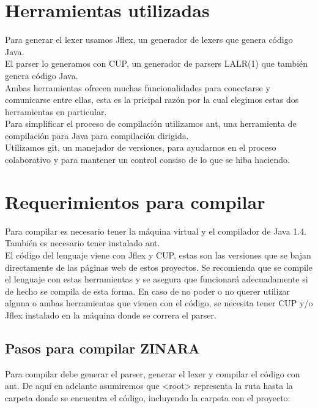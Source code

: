 \documentclass[12pt, spanish]{report}
\begin{document}
\section{Herramientas utilizadas}
\label{sec:herramientas}
Para generar el lexer usamos Jflex, un generador de lexers que genera
c\'odigo Java.\\
El parser lo generamos con CUP, un generador de parsers LALR(1) que
tambi\'en genera c\'odigo Java.\\
Ambas herramientas ofrecen muchas funcionalidades para conectarse y
comunicarse entre ellas, esta es la pricipal raz\'on por la cual elegimos
estas dos herramientas en particular.\\
Para simplificar el proceso de compilaci\'on utilizamos ant, una
herramienta de compilaci\'on para Java para compilaci\'on dirigida.\\
Utilizamos git, un manejador de versiones, para ayudarnos en el proceso
colaborativo y para mantener un control consiso de lo que se hiba
haciendo.

\section{Requerimientos para compilar}
\label{sec:requ}
Para compilar es necesario tener la m\'aquina virtual y el compilador de
Java 1.4. Tambi\'en es necesario tener instalado ant.\\
El c\'odigo del lenguaje viene con Jflex y CUP, estas son las versiones
que se bajan directamente de las p\'aginas web de estos proyectos. Se
recomienda que se compile el lenguaje con estas herramientas y se
asegura que funcionar\'a adecuadamente si de hecho se compila de esta
forma. En caso de no poder o no querer utilizar alguna o ambas
herramientas que vienen con el c\'odigo, se necesita tener CUP y/o Jflex
instalado en la m\'aquina donde se correra el parser.\\

\subsection{Pasos para compilar ZINARA}
\label{sec:compilacion}
Para compilar debe generar el parser, generar el lexer y compilar el
c\'odigo con ant. De aqu\'i en adelante asumiremos que <root> representa
la ruta hasta la carpeta donde se encuentra el c\'odigo, incluyendo la
carpeta con el proyecto:
\end{document}

